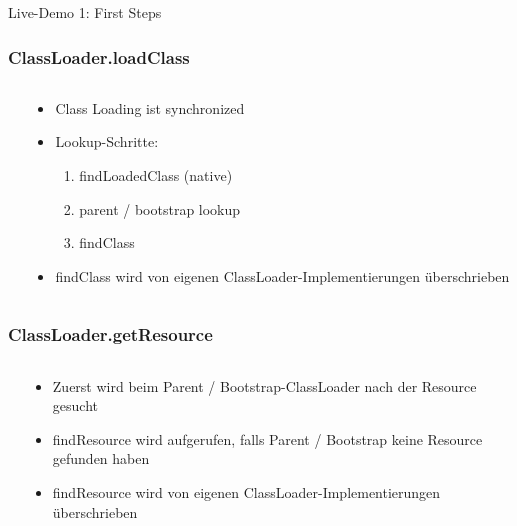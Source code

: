 \documentclass[aspectratio=169]{beamer}
\begin{document}
\begin{frame}
	Live-Demo 1: First Steps
\end{frame}

\begin{frame}
	\frametitle{ClassLoader.loadClass}
	\begin{columns}[T] 
		\begin{column}{.57\textwidth}
			
		\end{column}
		\hfill
		\begin{column}{.43\textwidth}
			\begin{itemize}
				\item{Class Loading ist synchronized}
				\item{Lookup-Schritte:}
				\begin{enumerate}
				\item{findLoadedClass (native)}
				\item{parent / bootstrap lookup}
				\item{findClass}
				\end{enumerate}
				\item{findClass wird von eigenen ClassLoader-Implementierungen überschrieben}
			\end{itemize}
		\end{column}
	\end{columns}
\end{frame}

\begin{frame}[fragile]
	\frametitle{ClassLoader.getResource}
	\begin{columns}[T] 
		\begin{column}{.50\textwidth}
			
	\end{column}
	\hfill
	\begin{column}{.50\textwidth}
			\begin{itemize}
				\item{Zuerst wird beim Parent / Bootstrap-ClassLoader nach der Resource gesucht}
				\item{findResource wird aufgerufen, falls Parent / Bootstrap keine Resource gefunden haben}
				\item{findResource wird von eigenen ClassLoader-Implementierungen überschrieben}
			\end{itemize}
		\end{column}
	\end{columns}
\end{frame}
\end{document}
